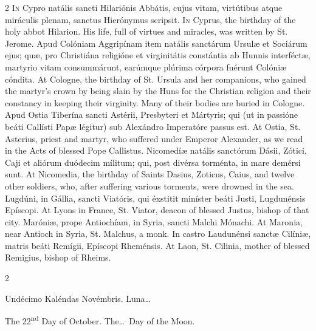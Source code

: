 \begin{paracol}{2}
\lettrine[lines=2]{I}{n} Cypro natális sancti 
 Hilariónis Abbátis, cujus vitam, virtútibus atque miráculis plenam, sanctus 
 Hierónymus scripsit.
\switchcolumn
{}
\lettrine[lines=2]{I}{n} Cyprus, the birthday of the holy 
 abbot Hilarion. His life, full of virtues and miracles, was written by 
 St. Jerome.
\switchcolumn*
{}
Apud Colóniam 
 Aggripínam item natális sanctárum Ursulæ et Sociárum ejus; quæ, pro 
 Christiána religióne et virginitátis constántia ab Hunnis interféctæ, 
 martyrio vitam consummárunt, earúmque plúrima córpora fuérunt Colóniæ 
 cóndita.
\switchcolumn
{}
At Cologne, the birthday of St. 
 Ursula and her companions, who gained the martyr's crown by being slain by 
 the Huns for the Christian religion and their constancy in keeping their 
 virginity. Many of their bodies are buried in Cologne.
\switchcolumn*
{}
Apud Ostia Tiberína 
 sancti Astérii, Presbyteri et Mártyris; qui (ut in passióne beáti Callísti 
 Papæ légitur) sub Alexándro Imperatóre passus est.
\switchcolumn
{}
At Ostia, St. Asterius, priest and 
 martyr, who suffered under Emperor Alexander, as we read in the Acts of 
 blessed Pope Callistus.
\switchcolumn*
{}
Nicomedíæ natális 
 sanctórum Dásii, Zótici, Caji et aliórum duódecim mílitum; qui, post divérsa 
 torménta, in mare demérsi sunt.
\switchcolumn
{}
At Nicomedia, the birthday of Saints 
 Dasius, Zoticus, Caius, and twelve other soldiers, who, after suffering 
 various torments, were drowned in the sea.
\switchcolumn*
{}
Lugdúni, in Gállia, 
 sancti Viatóris, qui éxstitit miníster beáti Justi, Lugdunénsis Epíscopi.
\switchcolumn
{}
At Lyons in France, St. Viator, 
 deacon of blessed Justus, bishop of that city.
\switchcolumn*
{}
Maróniæ, prope 
 Antiochíam, in Syria, sancti Malchi Mónachi.
\switchcolumn
{}
At Maronia, near Antioch in Syria, 
 St. Malchus, a monk.
\switchcolumn*
{}
In castro Laudunénsi 
 sanctæ Cilíniæ, matris beáti Remígii, Epíscopi Rheménsis.
\switchcolumn
{}
At Laon, St. Cilinia, mother of 
 blessed Remigius, bishop of Rheims.
\switchcolumn*
{}
\end{paracol}


\begin{paracol}{2}
\begin{center}{\color{gregoriocolor} Undécimo Kaléndas Novémbris. 
 Luna\dots\ }\end{center}
\switchcolumn
{}
\begin{center}{\color{gregoriocolor} The 
 22\textsuperscript{nd} Day of 
 October. The\dots\ Day of the Moon.}\end{center}
\end{paracol}

